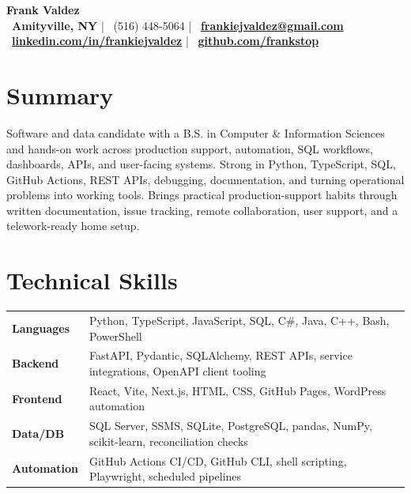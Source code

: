 \documentclass[10pt,letterpaper]{article}
\begin{document}
\fontsize{9.25}{11.05}\selectfont

\begin{center}
  {\fontsize{24}{26}\selectfont \textbf{Frank Valdez}}\\[1.5pt]
  \faMapMarker*~\textbf{Amityville, NY} \quad | \quad \faPhone*~(516) 448-5064 \quad | \quad \faEnvelope~\href{mailto:frankiejvaldez@gmail.com}{\textbf{frankiejvaldez@gmail.com}}\\[1pt]
  \faLinkedin~\href{https://linkedin.com/in/frankiejvaldez}{\textbf{linkedin.com/in/frankiejvaldez}} \quad | \quad \faGithub~\href{https://github.com/frankstop}{\textbf{github.com/frankstop}}
\end{center}

\section*{Summary}
Software and data candidate with a B.S. in Computer \& Information Sciences and hands-on work across production support, automation, SQL workflows, dashboards, APIs, and user-facing systems. Strong in Python, TypeScript, SQL, GitHub Actions, REST APIs, debugging, documentation, and turning operational problems into working tools. Brings practical production-support habits through written documentation, issue tracking, remote collaboration, user support, and a telework-ready home setup.

\section*{Technical Skills}
\begin{tabularx}{\textwidth}{@{}>{\bfseries}p{1.15in} >{\raggedright\arraybackslash}X@{}}
Languages & Python, TypeScript, JavaScript, SQL, C\#, Java, C++, Bash, PowerShell\\
Backend & FastAPI, Pydantic, SQLAlchemy, REST APIs, service integrations, OpenAPI client tooling\\
Frontend & React, Vite, Next.js, HTML, CSS, GitHub Pages, WordPress automation\\
Data/DB & SQL Server, SSMS, SQLite, PostgreSQL, pandas, NumPy, scikit-learn, reconciliation checks\\
Automation & GitHub Actions CI/CD, GitHub CLI, shell scripting, Playwright, scheduled pipelines\\
\end{tabularx}
\end{document}
